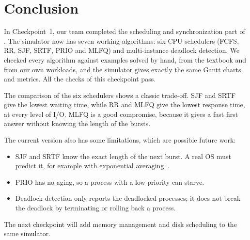\section{Conclusion}
\label{sec:conclusion}
In Checkpoint~1, our team completed the scheduling and synchronization part of \ossim. The simulator now has seven working algorithms: six CPU schedulers (FCFS, RR, SJF, SRTF, PRIO and MLFQ) and multi-instance deadlock detection. We checked every algorithm against examples solved by hand, from the textbook and from our own workloads, and the simulator gives exactly the same Gantt charts and metrics. All the checks of this checkpoint pass.

The comparison of the six schedulers shows a classic trade-off. SJF and SRTF give the lowest waiting time, while RR and MLFQ give the lowest response time, at every level of I/O. MLFQ is a good compromise, because it gives a fast first answer without knowing the length of the bursts.

The current version also has some limitations, which are possible future work:
\begin{itemize}
    \item SJF and SRTF know the exact length of the next burst. A real OS must predict it, for example with exponential averaging~\cite[Sec.~5.3.2]{silberschatz}.
    \item PRIO has no aging, so a process with a low priority can starve.
    \item Deadlock detection only reports the deadlocked processes; it does not break the deadlock by terminating or rolling back a process.
\end{itemize}
The next checkpoint will add memory management and disk scheduling to the same simulator.
